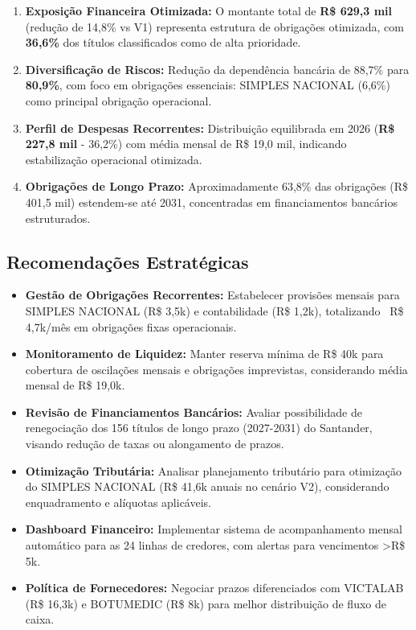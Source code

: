 \documentclass[12pt, a4paper]{article}
\newcommand{\reais}[1]{R\$ #1}
\begin{document}
\begin{enumerate}
    \item \textbf{Exposição Financeira Otimizada:} O montante total de \textbf{R\$ 629,3 mil} (redução de 14,8\% vs V1) representa estrutura de obrigações otimizada, com \textbf{36,6\%} dos títulos classificados como de alta prioridade.

    \item \textbf{Diversificação de Riscos:} Redução da dependência bancária de 88,7\% para \textbf{80,9\%}, com foco em obrigações essenciais: SIMPLES NACIONAL (6,6\%) como principal obrigação operacional.

    \item \textbf{Perfil de Despesas Recorrentes:} Distribuição equilibrada em 2026 (\textbf{R\$ 227,8 mil} - 36,2\%) com média mensal de R\$ 19,0 mil, indicando estabilização operacional otimizada.

    \item \textbf{Obrigações de Longo Prazo:} Aproximadamente 63,8\% das obrigações (\reais{401,5 mil}) estendem-se até 2031, concentradas em financiamentos bancários estruturados.
\end{enumerate}

\subsection{Recomendações Estratégicas}

\begin{itemize}
    \item \textbf{Gestão de Obrigações Recorrentes:} Estabelecer provisões mensais para SIMPLES NACIONAL (R\$ 3,5k) e contabilidade (R\$ 1,2k), totalizando ~R\$ 4,7k/mês em obrigações fixas operacionais.

    \item \textbf{Monitoramento de Liquidez:} Manter reserva mínima de R\$ 40k para cobertura de oscilações mensais e obrigações imprevistas, considerando média mensal de R\$ 19,0k.

    \item \textbf{Revisão de Financiamentos Bancários:} Avaliar possibilidade de renegociação dos 156 títulos de longo prazo (2027-2031) do Santander, visando redução de taxas ou alongamento de prazos.

    \item \textbf{Otimização Tributária:} Analisar planejamento tributário para otimização do SIMPLES NACIONAL (R\$ 41,6k anuais no cenário V2), considerando enquadramento e alíquotas aplicáveis.

    \item \textbf{Dashboard Financeiro:} Implementar sistema de acompanhamento mensal automático para as 24 linhas de credores, com alertas para vencimentos >R\$ 5k.

    \item \textbf{Política de Fornecedores:} Negociar prazos diferenciados com VICTALAB (R\$ 16,3k) e BOTUMEDIC (R\$ 8k) para melhor distribuição de fluxo de caixa.
\end{itemize}
\end{document}
